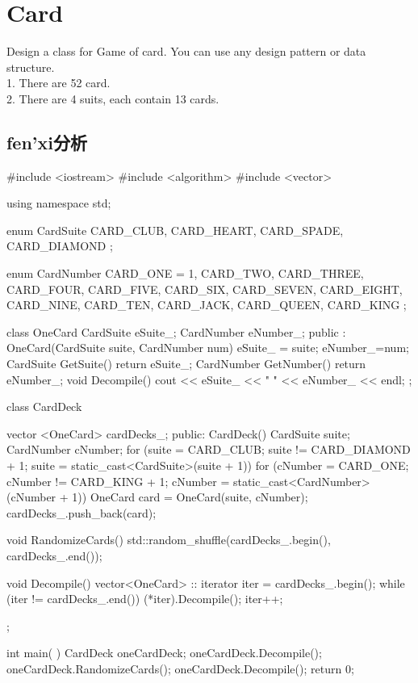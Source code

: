 \section{Card}
Design a class for Game of card. You can use any design pattern or data structure. \\
1. There are 52 card. \\
2. There are 4 suits, each contain 13 cards.

\subsection{fen'xi分析}
\begin{Code}
	#include <iostream>
	#include <algorithm>
	#include <vector>
	
	using namespace std;
	
	enum CardSuite{
		CARD_CLUB,
		CARD_HEART,
		CARD_SPADE,
		CARD_DIAMOND
	};
	
	enum CardNumber {
		CARD_ONE = 1,
		CARD_TWO,
		CARD_THREE,
		CARD_FOUR,
		CARD_FIVE,
		CARD_SIX,
		CARD_SEVEN,
		CARD_EIGHT,
		CARD_NINE,
		CARD_TEN,
		CARD_JACK,
		CARD_QUEEN,
		CARD_KING	
	};
	
	class OneCard{
		CardSuite eSuite_;
		CardNumber eNumber_;
	public :
		OneCard(CardSuite suite, CardNumber num){
			eSuite_ = suite;
			eNumber_=num;
		}
		CardSuite GetSuite(){
			return eSuite_;
		}
		CardNumber GetNumber() {
			return eNumber_;
		}
		void Decompile(){
			cout << eSuite_ << " " << eNumber_ << endl;
		}
	};
	
	class CardDeck{
		vector <OneCard> cardDecks_;
		public:
		CardDeck(){
			CardSuite suite;
			CardNumber cNumber;
			for (suite = CARD_CLUB; suite != CARD_DIAMOND + 1; suite = static_cast<CardSuite>(suite + 1)){
				for (cNumber = CARD_ONE; cNumber != CARD_KING + 1; cNumber = static_cast<CardNumber>(cNumber + 1)){
					OneCard card = OneCard(suite, cNumber);
					cardDecks_.push_back(card);
				}
			}
		}
		
		void RandomizeCards(){
			std::random_shuffle(cardDecks_.begin(), cardDecks_.end());
		}
		
		void Decompile() {
			vector<OneCard> :: iterator iter = cardDecks_.begin();
			while (iter != cardDecks_.end()){
				(*iter).Decompile();
				iter++;
			}
		}
	};
	
	
	int main( ){
		CardDeck oneCardDeck;
		oneCardDeck.Decompile();
		oneCardDeck.RandomizeCards();
		oneCardDeck.Decompile();
		return 0;
	}
\end{Code}

